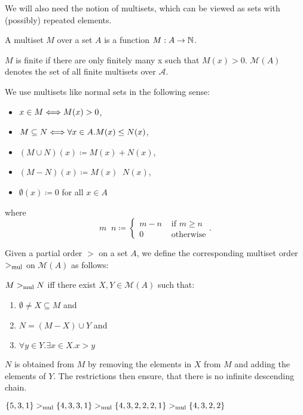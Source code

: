 We will also need the notion of multisets, which can be viewed as sets with (possibly) repeated elements.
\begin{definition*}
	A multiset $M$ over a set $A$ is a function $M : A \to \mathbb{N}$.

	$M$ is finite if there are only finitely many x such that $M(x) > 0$.
	$\mathcal{M}(A)$ denotes the set of all finite multisets over $\mathcal{A}$.
\end{definition*}
\begin{notation}
	We use multisets like normal sets in the following sense:
	\begin{itemize}
		\item $x \in M \logeq M(x) > 0$,
		\item $M \subseteq N \logeq \forall x \in A. M(x) \leq N(x)$,
		\item $(M \cup N)(x) \coloneqq M(x) + N(x)$,
		\item $(M-N)(x) \coloneqq M(x)  \mathop{\dot{-}} N(x)$,
		\item $\emptyset(x) \coloneqq 0$ for all $x \in A$
	\end{itemize}
	where
	\[
		m \mathop{ \dot{-}} n \coloneqq 
		\begin{cases}
			m - n &\text{ if $m \geq n$} \\
			0 &\text{ otherwise}
		\end{cases}
	.\]
\end{notation}
\begin{definition*}
	Given a partial order $>$ on a set $A$, we define the corresponding multiset order
	$>_{\mathit{\text{mul}}}$ on $\mathcal{M}(A)$ as follows:

	$M >_{\mathit{\text{mul}}} N $ iff there exist $X,Y \in \mathcal{M}(A)$ such that:
	\begin{enumerate}
		\item $\emptyset \neq X \subseteq M$ and
		\item $N = (M - X) \cup Y$ and
		\item $\forall y \in Y. \exists x \in X. x > y$
	\end{enumerate}
\end{definition*}
\begin{note}
	$N$ is obtained from $M$ by removing the elements in $X$ from $M$ 
	and adding the elements of $Y$.
	The restrictions then ensure, that there is no infinite descending chain.
\end{note}
\begin{example}
	$\left\{5, 3, 1 \right\} >_{\mathit{\text{mul}}} \left\{ 4, 3, 3, 1 \right\} >_{\mathit{\text{mul}}} \left\{ 4, 3, 2, 2, 2, 1 \right\} >_{\mathit{\text{mul}}} \left\{ 4, 3, 2, 2 \right\}$
\end{example}

